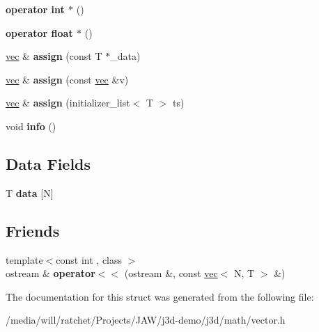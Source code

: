 \begin{DoxyCompactItemize}
\item 
\hypertarget{structj3d_1_1vec_ab8a00206a8831b4f08541a5a93cb5219}{}{\bfseries operator int $\ast$} ()\label{structj3d_1_1vec_ab8a00206a8831b4f08541a5a93cb5219}

\item 
\hypertarget{structj3d_1_1vec_a69692d9947445b2b260f0d64fd313f44}{}{\bfseries operator float $\ast$} ()\label{structj3d_1_1vec_a69692d9947445b2b260f0d64fd313f44}

\item 
\hypertarget{structj3d_1_1vec_afbc46c6bf2d6681be373b05da3611aa7}{}\hyperlink{structj3d_1_1vec}{vec} \& {\bfseries assign} (const T $\ast$\+\_\+data)\label{structj3d_1_1vec_afbc46c6bf2d6681be373b05da3611aa7}

\item 
\hypertarget{structj3d_1_1vec_adf5adb7a8e4540f8f5544c452385fed5}{}\hyperlink{structj3d_1_1vec}{vec} \& {\bfseries assign} (const \hyperlink{structj3d_1_1vec}{vec} \&v)\label{structj3d_1_1vec_adf5adb7a8e4540f8f5544c452385fed5}

\item 
\hypertarget{structj3d_1_1vec_a93fc32a3dc61ade18a1a9debc992bac5}{}\hyperlink{structj3d_1_1vec}{vec} \& {\bfseries assign} (initializer\+\_\+list$<$ T $>$ ts)\label{structj3d_1_1vec_a93fc32a3dc61ade18a1a9debc992bac5}

\item 
\hypertarget{structj3d_1_1vec_aa4285335806bb091323733c8fc35302f}{}void {\bfseries info} ()\label{structj3d_1_1vec_aa4285335806bb091323733c8fc35302f}

\end{DoxyCompactItemize}
\subsection*{Data Fields}
\begin{DoxyCompactItemize}
\item 
\hypertarget{structj3d_1_1vec_a241eaaa204677acadb20a0f83f58b9ff}{}T {\bfseries data} \mbox{[}N\mbox{]}\label{structj3d_1_1vec_a241eaaa204677acadb20a0f83f58b9ff}

\end{DoxyCompactItemize}
\subsection*{Friends}
\begin{DoxyCompactItemize}
\item 
\hypertarget{structj3d_1_1vec_a5990ef021fed1ca44506d7460f022549}{}{\footnotesize template$<$const int , class $>$ }\\ostream \& {\bfseries operator$<$$<$} (ostream \&, const \hyperlink{structj3d_1_1vec}{vec}$<$ N, T $>$ \&)\label{structj3d_1_1vec_a5990ef021fed1ca44506d7460f022549}

\end{DoxyCompactItemize}


The documentation for this struct was generated from the following file\+:\begin{DoxyCompactItemize}
\item 
/media/will/ratchet/\+Projects/\+J\+A\+W/j3d-\/demo/j3d/math/vector.\+h\end{DoxyCompactItemize}
